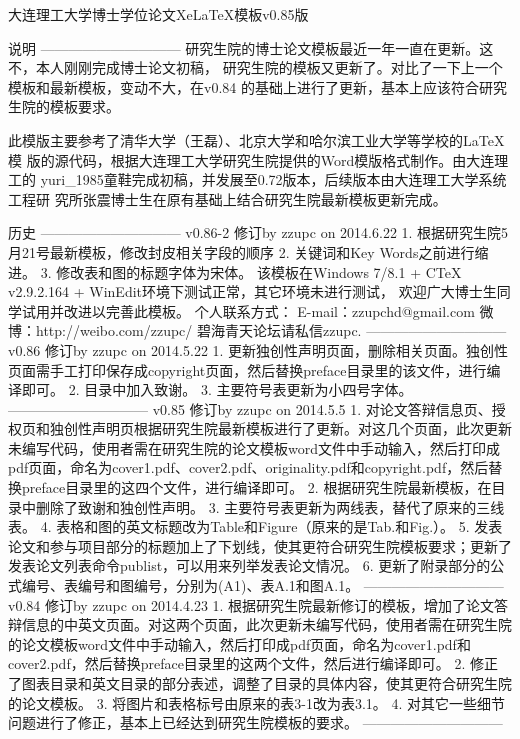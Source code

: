 大连理工大学博士学位论文XeLaTeX模板v0.85版


说明
------------------------------
研究生院的博士论文模板最近一年一直在更新。这不，本人刚刚完成博士论文初稿，
研究生院的模板又更新了。对比了一下上一个模板和最新模板，变动不大，在v0.84
的基础上进行了更新，基本上应该符合研究生院的模板要求。

此模版主要参考了清华大学（王磊）、北京大学和哈尔滨工业大学等学校的LaTeX模
版的源代码，根据大连理工大学研究生院提供的Word模版格式制作。由大连理工的
yuri_1985童鞋完成初稿，并发展至0.72版本，后续版本由大连理工大学系统工程研
究所张震博士生在原有基础上结合研究生院最新模板更新完成。

历史
------------------------------
v0.86-2 修订by zzupc on 2014.6.22
1. 根据研究生院5月21号最新模板，修改封皮相关字段的顺序
2. 关键词和Key Words之前进行缩进。
3. 修改表和图的标题字体为宋体。
该模板在Windows 7/8.1 + CTeX v2.9.2.164 + WinEdit环境下测试正常，其它环境未进行测试，
欢迎广大博士生同学试用并改进以完善此模板。
个人联系方式：
E-mail：zzupchd@gmail.com
微博：http://weibo.com/zzupc/
碧海青天论坛请私信zzupc.
------------------------------
v0.86 修订by zzupc on 2014.5.22
1. 更新独创性声明页面，删除相关页面。独创性页面需手工打印保存成copyright页面，然后替换preface目录里的该文件，进行编译即可。
2. 目录中加入致谢。
3. 主要符号表更新为小四号字体。
------------------------------
v0.85 修订by zzupc on 2014.5.5
1. 对论文答辩信息页、授权页和独创性声明页根据研究生院最新模板进行了更新。对这几个页面，此次更新未编写代码，使用者需在研究生院的论文模板word文件中手动输入，然后打印成pdf页面，命名为cover1.pdf、cover2.pdf、originality.pdf和copyright.pdf，然后替换preface目录里的这四个文件，进行编译即可。
2. 根据研究生院最新模板，在目录中删除了致谢和独创性声明。
3. 主要符号表更新为两线表，替代了原来的三线表。
4. 表格和图的英文标题改为Table和Figure（原来的是Tab.和Fig.）。
5. 发表论文和参与项目部分的标题加上了下划线，使其更符合研究生院模板要求；更新了发表论文列表命令publist，可以用来列举发表论文情况。
6. 更新了附录部分的公式编号、表编号和图编号，分别为(A1)、表A.1和图A.1。
------------------------------
v0.84 修订by zzupc on 2014.4.23
1. 根据研究生院最新修订的模板，增加了论文答辩信息的中英文页面。对这两个页面，此次更新未编写代码，使用者需在研究生院的论文模板word文件中手动输入，然后打印成pdf页面，命名为cover1.pdf和cover2.pdf，然后替换preface目录里的这两个文件，然后进行编译即可。
2. 修正了图表目录和英文目录的部分表述，调整了目录的具体内容，使其更符合研究生院的论文模板。
3. 将图片和表格标号由原来的表3-1改为表3.1。
4. 对其它一些细节问题进行了修正，基本上已经达到研究生院模板的要求。
------------------------------
